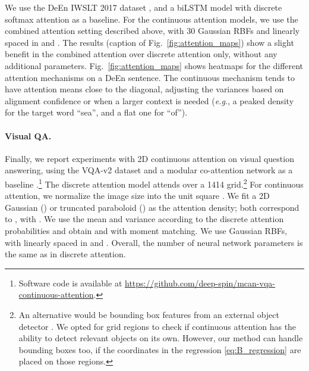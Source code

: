 \documentclass{article}
\begin{document}
We use the DeEn IWSLT 2017 dataset \citep{cettolo2017overview}, and a biLSTM model with discrete softmax attention as a baseline. 
For the continuous attention models, we use the combined attention setting described above, with 30 Gaussian RBFs and  linearly spaced in  and . 
The results (caption of Fig.~\ref{fig:attention_maps}) show a slight benefit in the combined  attention over discrete attention only, without any additional parameters. Fig.~\ref{fig:attention_maps} shows heatmaps for the different attention mechanisms on a DeEn sentence. The continuous mechanism tends to have attention means close to the diagonal,   adjusting the variances based on alignment confidence or when a larger context is needed ({\it e.g.}, a peaked density for the target word ``sea'', and a flat one for ``of'').


\begin{comment}
\begin{SCtable}[][t]
    \caption{BLEU scores for the DeEn machine translation task.} 
    \label{table:results_nmt}
    \begin{small}
\begin{tabular}{lc}
        \toprule
        {\sc Attention}     		& BLEU (\%)		 	\\
        \midrule
        Discrete     		& 23.92		 	\\
        \midrule
        Disc. + Cont. softmax		& 24.00		  	\\
        Disc. + Cont. sparsemax	 	& \bf 24.25		  	\\
        \bottomrule
    \end{tabular}
\end{small}
\end{SCtable}
\end{comment}


\paragraph{Visual QA.} 



Finally, we report experiments with 2D continuous attention on visual question answering, using the VQA-v2 dataset \cite{Goyal2019} and a modular co-attention network as a baseline \cite{Yu2019}.\footnote{Software code is available at \url{https://github.com/deep-spin/mcan-vqa-continuous-attention}.} The discrete attention model attends over a  1414 grid.\footnote{An alternative would be bounding box features from an external object detector \citep{anderson2018bottom}. We opted for grid regions to check if continuous attention has the ability to detect relevant objects on its own. However, our method can handle bounding boxes too, if  the  coordinates in the  regression
\eqref{eq:B_regression} are placed on those regions.} For continuous attention, we normalize the image size into the unit square . We fit a 2D Gaussian () or truncated paraboloid () as the attention density; both correspond  to  , with . We use the mean and variance according to the discrete attention probabilities and obtain  and  with moment matching. We use  Gaussian RBFs, with  linearly spaced in   and . Overall, the number of neural network parameters is the same as in discrete attention. 
\end{document}
